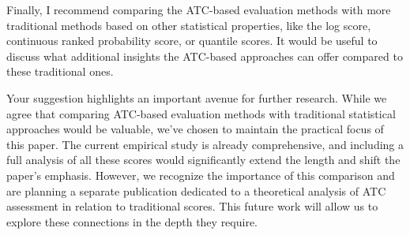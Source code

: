 \documentclass[12pt]{journalrebuttal}
\begin{document}
\begin{revcomment}
    Finally, I recommend comparing the ATC-based evaluation methods with more traditional methods based on other statistical properties, like the log score, continuous ranked probability score, or quantile scores. It would be useful to discuss what additional insights the ATC-based approaches can offer compared to these traditional ones.
\end{revcomment}
\begin{response}
Your suggestion highlights an important avenue for further research. While we agree that comparing ATC-based evaluation methods with traditional statistical approaches would be valuable, we've chosen to maintain the practical focus of this paper. The current empirical study is already comprehensive, and including a full analysis of all these scores would significantly extend the length and shift the paper's emphasis. However, we recognize the importance of this comparison and are planning a separate publication dedicated to a theoretical analysis of ATC assessment in relation to traditional scores. This future work will allow us to explore these connections in the depth they require.
\end{response}
\end{document}
